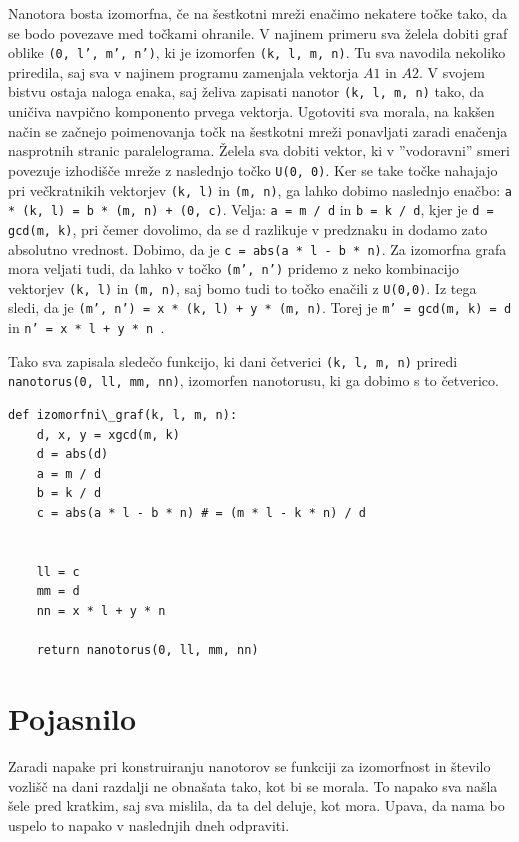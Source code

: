 \documentclass[a4paper, 10 pt, titlepage]{article}
\begin{document}
Nanotora bosta izomorfna, če na šestkotni mreži enačimo nekatere točke tako, da se bodo povezave med točkami ohranile. V najinem primeru sva želela dobiti graf oblike \texttt{(0, l', m', n')}, ki je izomorfen \texttt{(k, l, m, n)}. Tu sva navodila nekoliko priredila, saj sva v najinem programu zamenjala vektorja $A1$ in $A2$. V svojem bistvu ostaja naloga enaka, saj želiva zapisati nanotor \texttt{(k, l, m, n)} tako, da uničiva navpično komponento prvega vektorja. 
Ugotoviti sva morala, na kakšen način se začnejo poimenovanja točk na šestkotni mreži ponavljati zaradi enačenja nasprotnih stranic paralelograma. Želela sva dobiti vektor, ki v ''vodoravni'' smeri povezuje izhodišče mreže z naslednjo točko \texttt{U(0, 0)}. Ker se take točke nahajajo pri večkratnikih vektorjev \texttt{(k, l)} in \texttt{(m, n)}, ga lahko dobimo naslednjo enačbo: \texttt{a * (k, l) = b * (m, n) + (0, c)}. Velja: \texttt{a = m / d} in \texttt{b = k / d}, kjer je \texttt{d = gcd(m, k)}, pri čemer dovolimo, da se d razlikuje v predznaku in dodamo zato absolutno vrednost. Dobimo, da je \texttt{c = abs(a * l - b * n)}.
Za izomorfna grafa mora veljati tudi, da lahko v točko \texttt{(m', n')} pridemo z neko kombinacijo vektorjev \texttt{(k, l)} in \texttt{(m, n)}, saj bomo tudi to točko enačili z \texttt{U(0,0)}. Iz tega sledi, da je \texttt{(m', n') = x * (k, l) + y * (m, n)}. Torej je \texttt{m' = gcd(m, k) = d} in \texttt{n' = x * l + y * n }.

Tako sva zapisala sledečo funkcijo, ki dani četverici \texttt{(k, l, m, n)} priredi \texttt{nanotorus(0, ll, mm, nn)}, izomorfen nanotorusu, ki ga dobimo s to četverico.

\begin{verbatim}
def izomorfni\_graf(k, l, m, n):
    d, x, y = xgcd(m, k)
    d = abs(d)
    a = m / d
    b = k / d
    c = abs(a * l - b * n) # = (m * l - k * n) / d
    
    
    ll = c
    mm = d
    nn = x * l + y * n 
    
    return nanotorus(0, ll, mm, nn)
\end{verbatim}

\section{Pojasnilo}

Zaradi napake pri konstruiranju nanotorov se funkciji za izomorfnost in število vozlišč na dani razdalji ne obnašata tako, kot bi se morala. To napako sva našla šele pred kratkim, saj sva mislila, da ta del deluje, kot mora. Upava, da nama bo uspelo to napako v naslednjih dneh odpraviti.
\end{document}

